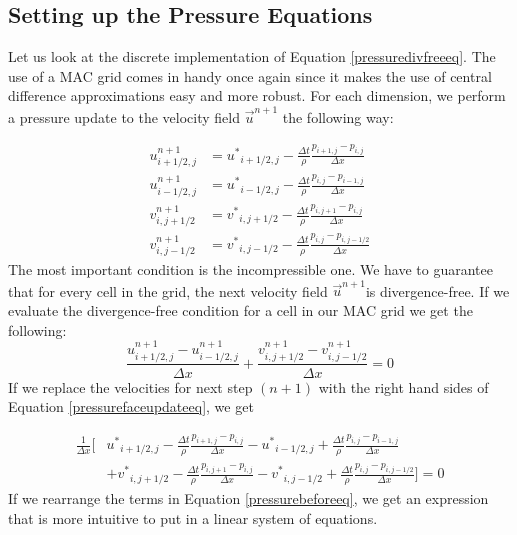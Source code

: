 \subsection{Setting up the Pressure Equations}

Let us look at the discrete implementation of Equation \ref {pressuredivfreeeq}. The use of a MAC grid comes in handy once again since it makes the use of central difference approximations easy and more robust. For each dimension, we perform a pressure update to the velocity field $\vec{u}^{n+1}$ the following way:

\begin{equation}
\begin{split}
u^{n+1}_{i+1/2,j} &= {u^*}_{i+1/2,j} - \frac{\Delta t }{\rho}\frac{p_{i+1,j} - p_{i,j}}{\Delta x} \\
u^{n+1}_{i-1/2,j} &= {u^*}_{i-1/2,j} - \frac{\Delta t }{\rho}\frac{p_{i,j} - p_{i-1,j}}{\Delta x} \\
v^{n+1}_{i,j+1/2} &= {v^*}_{i,j+1/2} - \frac{\Delta t }{\rho}\frac{p_{i,j+1} - p_{i,j}}{\Delta x} \\
v^{n+1}_{i,j-1/2} &= {v^*}_{i,j-1/2} - \frac{\Delta t }{\rho}\frac{p_{i,j} - p_{i,j-1/2}}{\Delta x}
\end{split}
\label{pressurefaceupdateeq}
\end{equation}
\noindent
The most important condition is the incompressible one. We have to guarantee that for every cell in the grid, the next velocity field $\vec{u}^{n+1}$is divergence-free. If we evaluate the divergence-free condition for a cell in our MAC grid we get the following:
\begin{equation}
\frac{u^{n+1}_{i+1/2,j} - u^{n+1}_{i-1/2,j}}{\Delta x} + \frac{v^{n+1}_{i,j+1/2} - v^{n+1}_{i,j-1/2}}{\Delta x} = 0
\end{equation}
\noindent
If we replace the velocities for next step $(n+1)$ with the right hand sides of Equation \ref{pressurefaceupdateeq}, we get

\begin{equation}
\begin{split}
\frac{1}{\Delta x}[ &{u^*}_{i+1/2,j} - \frac{\Delta t }{\rho}\frac{p_{i+1,j} - p_{i,j}}{\Delta x} 
 - {u^*}_{i-1/2,j} + \frac{\Delta t }{\rho}\frac{p_{i,j} - p_{i-1,j}}{\Delta x} \\
& + {v^*}_{i,j+1/2} - \frac{\Delta t }{\rho}\frac{p_{i,j+1} - p_{i,j}}{\Delta x} 
 -{v^*}_{i,j-1/2} + \frac{\Delta t }{\rho}\frac{p_{i,j} - p_{i,j-1/2}}{\Delta x} ] = 0
\end{split}
\label{pressurebeforeeq}
\end{equation}
\noindent
If we rearrange the terms in Equation \ref{pressurebeforeeq}, we get an expression that is more intuitive to put in a linear system of equations.

